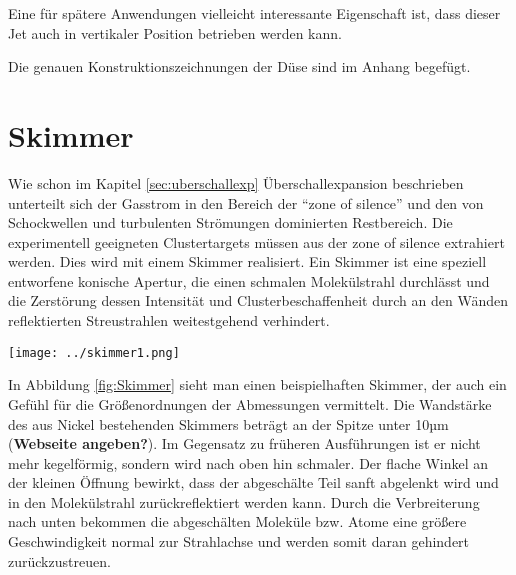 Eine für spätere Anwendungen vielleicht interessante Eigenschaft ist, dass dieser Jet auch in vertikaler Position betrieben werden kann.

Die genauen Konstruktionszeichnungen der Düse sind im Anhang begefügt.
%
%



\section{Skimmer} \label{sec:Skimmer}


Wie schon im Kapitel \ref{sec:uberschallexp} Überschallexpansion beschrieben unterteilt sich der Gasstrom in den Bereich der \enquote{zone of silence} und den von Schockwellen und turbulenten Strömungen dominierten Restbereich. Die experimentell geeigneten Clustertargets müssen aus der zone of silence extrahiert werden. Dies wird mit einem Skimmer realisiert. Ein Skimmer ist eine speziell entworfene konische Apertur, die einen schmalen Molekülstrahl durchlässt und die Zerstörung dessen Intensität und Clusterbeschaffenheit durch an den Wänden reflektierten Streustrahlen weitestgehend verhindert. 
\begin{center}
\begin{minipage}{\linewidth}
\centering
\texttt{[image: ../skimmer1.png]}%
 \label{fig:Skimmer}
\end{minipage} 
\end{center} 
In Abbildung \ref{fig:Skimmer} sieht man einen beispielhaften Skimmer, der auch ein Gefühl für die Größenordnungen der Abmessungen vermittelt. Die Wandstärke des aus Nickel bestehenden Skimmers beträgt an der Spitze unter 10µm (\textbf{Webseite angeben?}). Im Gegensatz zu früheren Ausführungen ist er nicht mehr kegelförmig, sondern wird nach oben hin schmaler. Der flache Winkel an der kleinen Öffnung bewirkt, dass der abgeschälte Teil sanft abgelenkt wird und in den Molekülstrahl zurückreflektiert werden kann. Durch die Verbreiterung nach unten bekommen die abgeschälten Moleküle bzw. Atome eine größere Geschwindigkeit normal zur Strahlachse und werden somit daran gehindert zurückzustreuen.

